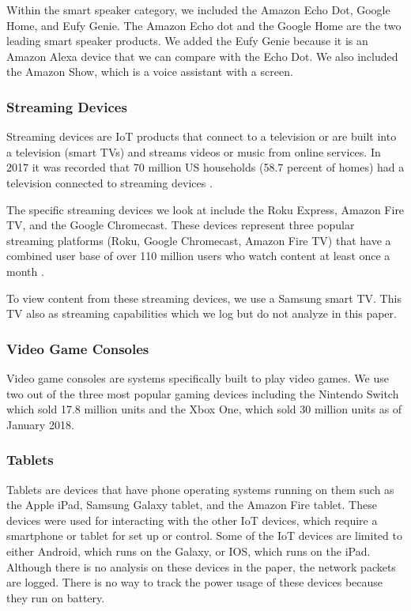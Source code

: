 Within the smart speaker category, we included the Amazon Echo Dot, Google Home, and Eufy Genie. The Amazon Echo dot and the Google Home are the two leading smart speaker products. We added the Eufy Genie because it is an Amazon Alexa device that we can compare with the Echo Dot. We also included the Amazon Show, which is a voice assistant with a screen.

\subsubsection{Streaming Devices}

Streaming devices are IoT products that connect to a television or are built into a television (smart TVs) and streams videos or music from online services. In 2017 it was recorded that 70 million US households (58.7 percent of homes) had a television connected to streaming devices \cite{lynch_2017}.

The specific streaming devices we look at include the Roku Express, Amazon Fire TV, and the Google Chromecast. These devices represent three popular streaming platforms (Roku, Google Chromecast, Amazon Fire TV) that have a combined user base of over 110 million users who watch content at least once a month \cite{emarketer_2017}.

To view content from these streaming devices, we use a Samsung smart TV. This TV also as streaming capabilities which we log but do not analyze in this paper.

\subsubsection{Video Game Consoles}

Video game consoles are systems specifically built to play video games. We use two out of the three most popular gaming devices including the Nintendo Switch which sold 17.8 million units \cite{nintendo} and the Xbox One, which sold 30 million units \cite{souppouris_2016} as of January 2018.

\subsubsection{Tablets}

Tablets are devices that have phone operating systems running on them such as the Apple iPad, Samsung Galaxy tablet, and the Amazon Fire tablet. These devices were used for interacting with the other IoT devices, which require a smartphone or tablet for set up or control. Some of the IoT devices are limited to either Android, which runs on the Galaxy, or IOS, which runs on the iPad. Although there is no analysis on these devices in the paper, the network packets are logged. There is no way to track the power usage of these devices because they run on battery.

